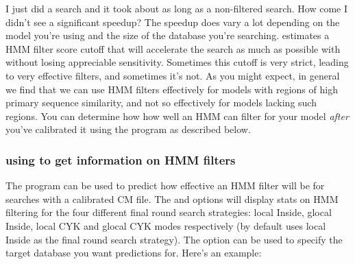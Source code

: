 \begin{srefaq}{I just did a search and it took about as long as a
    non-filtered search. How come I didn't see a significant speedup?}
  The speedup does vary a lot depending on the model you're using and
  the size of the database you're searching. 
  estimates a HMM filter score cutoff that will accelerate the search
  as much as possible with without losing appreciable
  sensitivity. Sometimes this cutoff is very strict, leading to very
  effective filters, and sometimes it's not. As you might expect, in
  general we find that we can use HMM filters effectively for models
  with regions of high primary sequence similarity, and not so
  effectively for models lacking such regions. You can determine how
  how well an HMM can filter for your model \emph{after} you've
  calibrated it using the  program as described below.
\end{srefaq}


\subsubsection{using  to get information on HMM filters}

The  program can be used to predict how effective an
HMM filter will be for searches with a calibrated CM file. The
 and  options will display stats on
HMM filtering for the four different final round search strategies:
local Inside, glocal Inside, local CYK and glocal CYK modes
respectively (by default  uses local Inside as the
final round search strategy). The  option can be
used to specify the target database you want predictions for. 
Here's an example:

\newpage


